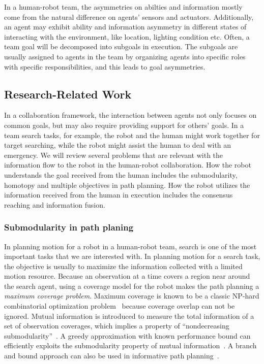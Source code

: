 \documentclass[phd]{byuprop}
\begin{document}
In a human-robot team, the asymmetries on abilties and information mostly come from the natural difference on agents’ sensors and actuators. 
Additionally, an agent may exhibit ability and information asymmetry in different states of interacting with the environment, like location, lighting condition etc. 
Often, a team goal will be decomposed into subgoals in execution. 
The subgoals are usually assigned to agents in the team by organizing agents into specific roles with specific responsibilities, and this leads to goal asymmetries.

\subsection{Research-Related Work}

In a collaboration framework, the interaction between agents not only focuses on common goals, but may also require providing support for others’ goals. 
In a team search tasks, for example, the robot and the human might work together for target searching, while the robot might assist the human to deal with an emergency.
We will review several problems that are relevant with the information flow to the robot in the human-robot collaboration.
How the robot understands the goal received from the human includes the submodularity, homotopy and multiple objectives in path planning.
How the robot utilizes the information received from the human in execution includes the consensus reaching and information fusion.

\subsubsection{Submodularity in path planing}

In planning motion for a robot in a human-robot team, search is one of the most important tasks that we are interested with.
In planning motion for a search task, the objective is usually to maximize the information collected with a limited motion resource.
Because an observation at a time covers a region near around the search agent, using a coverage model for the robot makes the path planning a {\em maximum coverage problem}.
Maximum coverage is known to be a classic NP-hard combinatorial optimization problem~\cite{Megiddo1983} because coverage overlap can not be ignored. 
Mutual information is introduced to measure the total information
of a set of observation coverages, which implies a property of
“nondecreasing submodularity”~\cite{Singh2009}. 
A greedy approximation with known performance bound can efficiently exploits the submodularity property of mutual information~\cite{Singh2009}. 
A branch and bound approach can also be used in informative path
planning~\cite{Binney2012}.
\end{document}
